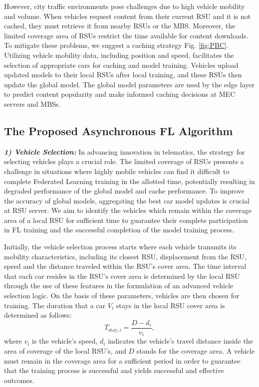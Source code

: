 \documentclass[journal]{IEEEtran}
\begin{document}
However, city traffic environments pose challenges due to high vehicle mobility and volume. When vehicles request content from their current RSU and it is not cached, they must retrieve it from nearby RSUs or the MBS. Moreover, the limited coverage area of RSUs restrict the time available for content downloads. To mitigate these problems, we suggest a caching strategy Fig. \ref{fig:PBC}. Utilizing vehicle mobility data, including position and speed, facilitates the selection of appropriate cars for caching and model training. Vehicles upload updated models to their local RSUs after local training, and these RSUs then update the global model. The global model parameters are used by the edge layer to predict content popularity and make informed caching decisions at MEC servers and MBSs.

\subsection{The Proposed Asynchronous FL Algorithm} 


\textbf{\textit{1) Vehicle Selection:}} In advancing innovation in telematics, the strategy for selecting vehicles plays a crucial role. The limited coverage of RSUs presents a challenge in situations where highly mobile vehicles can find it difficult to complete Federated Learning training in the allotted time, potentially resulting in degraded performance of the global model and cache performance. To improve the accuracy of global models, aggregating the best car model updates is crucial at RSU server. We aim to identify the vehicles which remain within the coverage area of a local RSU for sufficient time to guarantee their complete participation in  FL training and the successful completion of the model training process.

Initially, the vehicle selection process starts where each vehicle transmits its mobility characteristics, including its closest RSU, displacement from the RSU, speed and the distance traveled within the RSU's cover area. The time interval that each car resides in the RSU's cover area is determined by the local RSU through the use of these features in the formulation of an advanced vehicle selection logic. On the basis of these parameters, vehicles are then chosen for training. The duration that a car $V_i$ stays in the local RSU cover area is determined as follows:
\begin{equation}
T_{\text{stay}, i} = \frac{D - d_i}{v_i},
\end{equation}
where $v_i$ is the vehicle's speed, $d_i$ indicates the vehicle's travel distance inside the area of coverage of the local RSU's, and $D$ stands for the coverage area. A vehicle must remain in the coverage area for a sufficient period in order to guarantee that the training process is successful and yields successful and effective outcomes.
\end{document}

